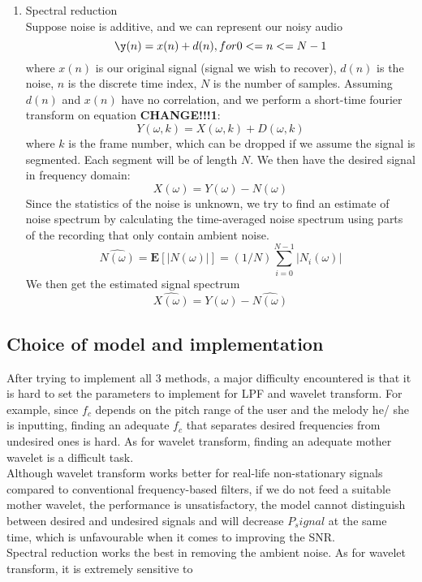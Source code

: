 \begin{enumerate}
	\item Spectral reduction\\
Suppose noise is additive, and we can represent our noisy audio 
\begin{equation} \label{eq:1}
\y(n) = x(n) + d(n), for 0 <= n <= N-1 
\end{equation}
where $x(n)$ is our original signal (signal we wish to recover), $d(n)$ is the noise, $n$ is the discrete time index,
$N$ is the number of samples. 
Assuming $d(n)$ and $x(n)$ have no correlation, and we perform a short-time fourier transform on equation \textbf{CHANGE!!!1}:
\[Y(\omega,k)= X(\omega,k) + D(\omega,k)\]
where $k$ is the frame number, which can be dropped if we assume the signal is segmented. Each segment will be of
length $N$. We then have the desired signal in frequency domain:
\[X(\omega) = Y(\omega) - N(\omega)\]
Since the statistics of the noise is unknown, we try to find an estimate of noise spectrum by calculating the time-averaged
noise spectrum using parts of the recording that only contain ambient noise. \cite{reductionmanual}
\[\hat{N(\omega)} = \textbf{E}[|N(\omega)|] = (1/N)\sum_{i=0}^{N-1}|N_i(\omega)|\]
We then get the estimated signal spectrum
\[\hat{X(\omega)} = Y(\omega) - \hat{N(\omega)}\]

\end{enumerate}

\subsection{Choice of model and implementation}
After trying to implement all 3 methods, a major difficulty encountered is that it is hard to set the parameters to 
implement for LPF and wavelet transform. For example, since $f_c$ depends on the pitch range of the user and the melody he/ she
is inputting, finding an adequate $f_c$ that separates desired frequencies from undesired ones is hard.
As for wavelet transform, finding an adequate mother wavelet is a difficult task.\\
Although wavelet transform works better for real-life non-stationary signals compared to conventional frequency-based filters, if we
do not feed a suitable mother wavelet, the performance is unsatisfactory, the model cannot distinguish between desired and undesired 
signals and will decrease $P_signal$ at the same time, which is unfavourable when it comes to improving the SNR.\\
Spectral reduction works the best in removing the ambient noise. As for wavelet transform, it is extremely sensitive to



